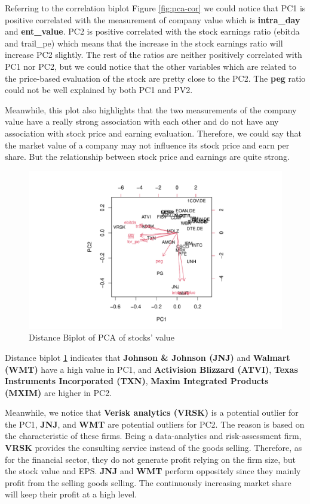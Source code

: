 \documentclass[11pt,a4paper,]{article}
\begin{document}
Referring to the correlation biplot Figure \ref{fig:pca-cor} we could notice that PC1 is positive correlated with the measurement of company value which is \textbf{intra\_day} and \textbf{ent\_value}. PC2 is positive correlated with the stock earnings ratio (ebitda and trail\_pe) which means that the increase in the stock earnings ratio will increase PC2 slightly. The rest of the ratios are neither positively correlated with PC1 nor PC2, but we could notice that the other variables which are related to the price-based evaluation of the stock are pretty close to the PC2. The \textbf{peg} ratio could not be well explained by both PC1 and PV2.

Meanwhile, this plot also highlights that the two measurements of the company value have a really strong association with each other and do not have any association with stock price and earning evaluation. Therefore, we could say that the market value of a company may not influence its stock price and earn per share. But the relationship between stock price and earnings are quite strong.

\begin{figure}
\centering
\includegraphics{ass2_files/figure-latex/bi-dis-1.pdf}
\caption{\label{fig:bi-dis}Distance Biplot of PCA of stocks' value}
\end{figure}

Distance biplot \ref{fig:bi-dis} indicates that \textbf{Johnson \& Johnson (JNJ)} and \textbf{Walmart (WMT)} have a high value in PC1, and \textbf{Activision Blizzard (ATVI)}, \textbf{Texas Instruments Incorporated (TXN)}, \textbf{Maxim Integrated Products (MXIM)} are higher in PC2.

Meanwhile, we notice that \textbf{Verisk analytics (VRSK)} is a potential outlier for the PC1, \textbf{JNJ}, and \textbf{WMT} are potential outliers for PC2. The reason is based on the characteristic of these firms. Being a data-analytics and risk-assessment firm, \textbf{VRSK} provides the consulting service instead of the goods selling. Therefore, as for the financial sector, they do not generate profit relying on the firm size, but the stock value and EPS. \textbf{JNJ} and \textbf{WMT} perform oppositely since they mainly profit from the selling goods selling. The continuously increasing market share will keep their profit at a high level.
\end{document}

